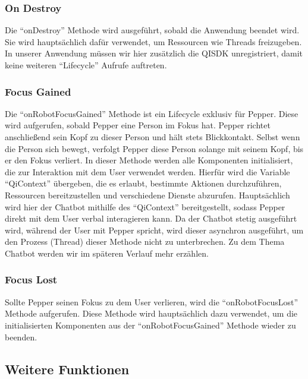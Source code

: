 \subsubsection{On Destroy} 

Die ``onDestroy'' Methode wird ausgeführt, sobald die Anwendung beendet wird. Sie wird hauptsächlich dafür verwendet, um Ressourcen 
wie Threads freizugeben. In unserer Anwendung müssen wir hier zusätzlich die QISDK unregistriert, damit keine weiteren ``Lifecycle'' 
Aufrufe auftreten. 

\subsubsection{Focus Gained} 

Die ``onRobotFocusGained'' Methode ist ein Lifecycle exklusiv für Pepper. Diese wird aufgerufen, sobald Pepper eine Person im Fokus 
hat. Pepper richtet anschließend sein Kopf zu dieser Person und hält stets Blickkontakt. Selbst wenn die Person sich bewegt, verfolgt Pepper 
diese Person solange mit seinem Kopf, bis er den Fokus verliert. 
In dieser Methode werden alle Komponenten initialisiert, die zur Interaktion mit dem User verwendet werden. Hierfür wird die Variable 
``QiContext'' übergeben, die es erlaubt, bestimmte Aktionen durchzuführen, Ressourcen bereitzustellen und verschiedene Dienste 
abzurufen. 
Hauptsächlich wird hier der Chatbot mithilfe des ``QiContext'' bereitgestellt, sodass Pepper direkt mit dem User verbal interagieren 
kann. Da der Chatbot stetig ausgeführt wird, während der User mit Pepper spricht, wird dieser asynchron ausgeführt, um den Prozess (Thread) 
dieser Methode nicht zu unterbrechen. Zu dem Thema Chatbot werden wir im späteren Verlauf mehr erzählen. 

\subsubsection{Focus Lost} 

Sollte Pepper seinen Fokus zu dem User verlieren, wird die ``onRobotFocusLost'' Methode aufgerufen. Diese Methode wird hauptsächlich 
dazu verwendet, um die initialisierten Komponenten aus der ``onRobotFocusGained'' Methode wieder zu beenden. 

\cite{Robot_lifecycle}

\newpage

\subsection{Weitere Funktionen}

